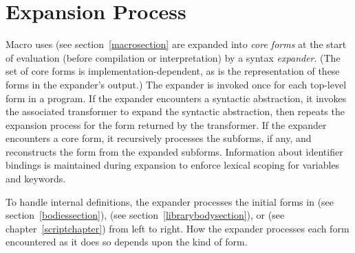 \chapter{Expansion Process}
\label{expansionchapter}

Macro uses (see section~\ref{macrosection} are expanded into \textit{core
forms} at the start of evaluation (before compilation or interpretation)
by a syntax \emph{expander}.
(The set of core forms is implementation-dependent, as is the
representation of these forms in the expander's output.)
The expander is invoked once for each top-level form in a program.
If the expander encounters a syntactic abstraction, it invokes
the associated transformer to expand the syntactic abstraction, then
repeats the expansion process for the form returned by the transformer.
If the expander encounters a core form, it recursively
processes the subforms, if any, and reconstructs the form from the
expanded subforms.
Information about identifier bindings is maintained during expansion
to enforce lexical scoping for variables and keywords.

To handle internal definitions, the expander processes the initial
forms in  (see section~\ref{bodiessection}),
 (see section~\ref{librarybodysection}), or
 (see chapter~\ref{scriptchapter}) from left to
right.  How the expander processes each form encountered as it does so
depends upon the kind of form.

